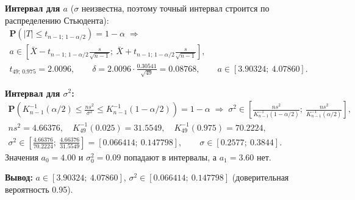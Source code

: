 \documentclass[12pt]{spbstu-task}
\renewcommand{\Prob}{\mathbf{P}}
\begin{document}
\textbf{Интервал для \(a\)} (\(\sigma\) неизвестна, поэтому точный интервал строится по распределению Стьюдента):
\begin{gather*}
  \Prob\left(|T| \le t_{n - 1;\,1 - \alpha/2}\right) = 1 - \alpha
  \;\Rightarrow\\
  a \in \left[\bar{X} - t_{n - 1;\,1 - \alpha/2}\frac{s}{\sqrt{n - 1}};\ \bar{X} + t_{n - 1;\,1 - \alpha/2}\frac{s}{\sqrt{n - 1}}\right],\\
  t_{49;\,0.975} = 2.0096,\qquad \delta = 2.0096\cdot\frac{0.30541}{\sqrt{49}} = 0.08768,\qquad
  a \in [3.90324;\ 4.07860].
\end{gather*}

\textbf{Интервал для \(\sigma^2\):}
\begin{gather*}
  \Prob\left(K^{-1}_{n - 1}(\alpha/2) \le \frac{ns^2}{\sigma^2} \le K^{-1}_{n - 1}(1 - \alpha/2)\right) = 1 - \alpha
  \;\Rightarrow\;
  \sigma^2 \in \left[\frac{ns^2}{K^{-1}_{n - 1}(1 - \alpha/2)};\ \frac{ns^2}{K^{-1}_{n - 1}(\alpha/2)}\right],\\
  ns^2 = 4.66376,\quad K^{-1}_{49}(0.025) = 31.5549,\quad K^{-1}_{49}(0.975) = 70.2224,\\
  \sigma^2 \in \left[\frac{4.66376}{70.2224};\ \frac{4.66376}{31.5549}\right] = [0.066414;\ 0.147798],
  \qquad \sigma \in [0.2577;\ 0.3844].
\end{gather*}
Значения \(a_0 = 4.00\) и \(\sigma_0^2 = 0.09\) попадают в интервалы, а \(a_1 = 3.60\) нет.

\noindent\textbf{Вывод:} \({a \in [3.90324;\ 4.07860]}\), \({\sigma^2 \in [0.066414;\ 0.147798]}\)
(доверительная вероятность 0.95).

\end{document}
